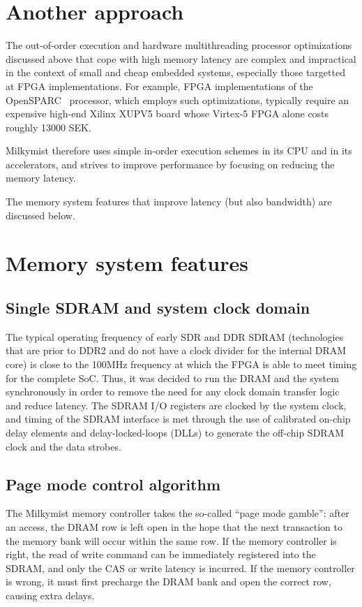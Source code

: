 \documentclass[a4paper,11pt]{kthesis}
\begin{document}
\section{Another approach}
The out-of-order execution and hardware multithreading processor optimizations discussed above that cope with high memory latency are complex and impractical in the context of small and cheap embedded systems, especially those targetted at FPGA implementations. For example, FPGA implementations of the OpenSPARC~\cite{opensparc} processor, which employs such optimizations, typically require an expensive high-end Xilinx XUPV5 board whose Virtex-5 FPGA alone costs roughly 13000 SEK.

Milkymist therefore uses simple in-order execution schemes in its CPU and in its accelerators, and strives to improve performance by focusing on reducing the memory latency.

The memory system features that improve latency (but also bandwidth) are discussed below.

\section{Memory system features}
\subsection{Single SDRAM and system clock domain}
The typical operating frequency of early SDR and DDR SDRAM (technologies that are prior to DDR2 and do not have a clock divider for the internal DRAM core) is close to the 100MHz frequency at which the FPGA is able to meet timing for the complete SoC. Thus, it was decided to run the DRAM and the system synchronously in order to remove the need for any clock domain transfer logic and reduce latency. The SDRAM I/O registers are clocked by the system clock, and timing of the SDRAM interface is met through the use of calibrated on-chip delay elements and delay-locked-loops (DLLs) to generate the off-chip SDRAM clock and the data strobes.

\subsection{Page mode control algorithm}
The Milkymist memory controller takes the so-called ``page mode gamble'': after an access, the DRAM row is left open in the hope that the next transaction to the memory bank will occur within the same row. If the memory controller is right, the read of write command can be immediately registered into the SDRAM, and only the CAS or write latency is incurred. If the memory controller is wrong, it must first precharge the DRAM bank and open the correct row, causing extra delays.
\end{document}
